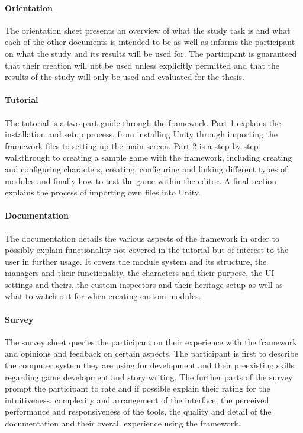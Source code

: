 \paragraph{Orientation} The orientation sheet presents an overview of what the study task is and what each of the other documents is intended to be as well as informs the participant on what the study and its results will be used for. The participant is guaranteed that their creation will not be used unless explicitly permitted and that the results of the study will only be used and evaluated for the thesis.
\paragraph{Tutorial} The tutorial is a two-part guide through the framework. 
Part 1 explains the installation and setup process, from installing Unity through importing the framework files to setting up the main screen. 
Part 2 is a step by step walkthrough to creating a sample game with the framework, including creating and configuring characters, creating, configuring and linking different types of modules and finally how to test the game within the editor. A final section explains the process of importing own files into Unity.
\paragraph{Documentation} The documentation details the various aspects of the framework in order to possibly explain functionality not covered in the tutorial but of interest to the user in further usage. It covers the module system and its structure, the managers and their functionality, the characters and their purpose, the UI settings and theirs, the custom inspectors and their heritage setup as well as what to watch out for when creating custom modules.
\paragraph{Survey} The survey sheet queries the participant on their experience with the framework and opinions and feedback on certain aspects. The participant is first to describe the computer system they are using for development and their preexisting skills regarding game development and story writing. The further parts of the survey prompt the participant to rate and if possible explain their rating for the intuitiveness, complexity and arrangement of the interface, the perceived performance and responsiveness of the tools, the quality and detail of the documentation and their overall experience using the framework. 
